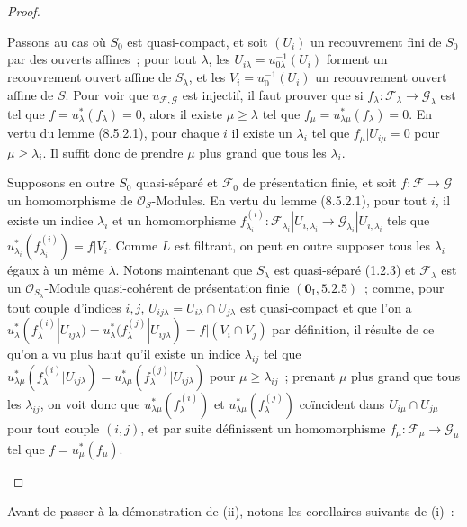 \begin{proof}
\begin{enumerate}[label=(\roman*)]
  Passons au cas où $S_0$ est quasi-compact, et soit $(U_i)$ un recouvrement
  fini de $S_0$ par des ouverts affines~; pour tout $\lambda$, les
  $U_{i\lambda}=u_{0\lambda}^{-1}(U_i)$ forment un recouvrement ouvert affine de
  $S_\lambda$, et les $V_i=u_0^{-1}(U_i)$ un recouvrement ouvert affine de $S$.
  Pour voir que $u_{\mathcal F,\mathcal G}$ est injectif, il faut prouver que
  si $f_\lambda:\mathcal F_\lambda\to\mathcal G_\lambda$ est tel que
  $f=u_\lambda^*(f_\lambda)=0$, alors il existe $\mu\geq\lambda$ tel que
  $f_\mu=u_{\lambda\mu}^*(f_\lambda)=0$. En vertu du lemme (8.5.2.1), pour
  chaque $i$ il existe un $\lambda_i$ tel que
  $f_\mu|U_{i\mu}=0$ pour $\mu\geq\lambda_i$. Il suffit donc de prendre $\mu$
  plus grand que tous les $\lambda_i$.

  Supposons en outre $S_0$ quasi-séparé et $\mathcal F_0$ de présentation finie,
  et soit $f:\mathcal F\to\mathcal G$ un homomorphisme de
  $\mathcal O_S$-Modules. En vertu du lemme (8.5.2.1), pour tout $i$, il existe
  un indice $\lambda_i$ et un homomorphisme
  $f_{\lambda_i}^{(i)}:\mathcal F_{\lambda_i}|U_{i,\lambda_i}
  \to\mathcal G_{\lambda_i}|U_{i,\lambda_i}$ tels que
  $u_{\lambda_i}^*(f_{\lambda_i}^{(i)})=f|V_i$. Comme $L$ est filtrant, on peut
  en outre supposer tous les $\lambda_i$ égaux à un même $\lambda$. Notons
  maintenant que $S_\lambda$ est quasi-séparé (1.2.3) et
  $\mathcal F_\lambda$ est un $\mathcal O_{S_\lambda}$-Module quasi-cohérent de
  présentation finie $(\mathbf{0}_{\mathrm I},5.2.5)$~; comme, pour tout couple d'indices
  $i,j$, $U_{ij\lambda}=U_{i\lambda}\cap U_{j\lambda}$ est quasi-compact et que
  l'on a
  $u_\lambda^*(f_\lambda^{(i)}|U_{ij\lambda})
    =u_\lambda^*(f_\lambda^{(j)}|U_{ij\lambda})
    =f|(V_i\cap V_j)$
  par définition, il résulte de ce qu'on a vu plus haut qu'il existe un indice
  $\lambda_{ij}$ tel que
  $u_{\lambda\mu}^*(f_\lambda^{(i)}|U_{ij\lambda})
    =u_{\lambda\mu}^*(f_\lambda^{(j)}|U_{ij\lambda})$
    pour $\mu\geq\lambda_{ij}$~;
  prenant $\mu$ plus grand que tous les $\lambda_{ij}$, on voit donc que
  $u_{\lambda\mu}^*(f_\lambda^{(i)})$ et
  $u_{\lambda\mu}^*(f_\lambda^{(j)})$ coïncident dans
  $U_{i\mu}\cap U_{j\mu}$ pour tout couple $(i,j)$, et par suite définissent
  un homomorphisme $f_\mu:\mathcal F_\mu\to\mathcal G_\mu$ tel que
  $f=u_\mu^*(f_\mu)$.
\end{enumerate}
\end{proof}

Avant de passer à la démonstration de (ii), notons les corollaires suivants de
(i)~:

